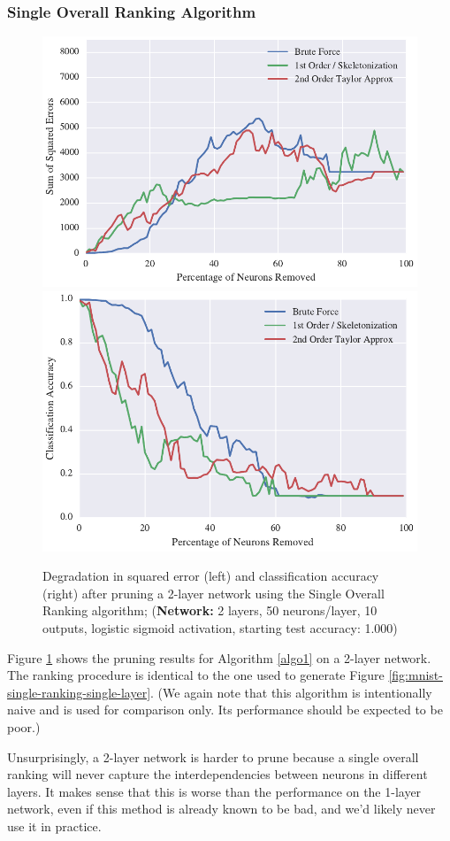 \subsubsection{Single Overall Ranking Algorithm}
\begin{figure}[!ht]
\centering
\includegraphics[width=0.49\linewidth]{png/mnist-deep-single-pass-method.pdf}
\includegraphics[width=0.49\linewidth]{png/mnist-deep-single-pass-accuracy.pdf}
\caption{Degradation in squared error (left) and classification accuracy (right) after pruning a 2-layer network using the Single Overall Ranking algorithm; (\textbf{Network:} 2 layers, 50 neurons/layer, 10 outputs, logistic sigmoid activation, starting test accuracy: 1.000)}
\label{fig:mnist-single-ranking-double-layer}
\end{figure}

Figure \ref{fig:mnist-single-ranking-double-layer} shows the pruning results for Algorithm \ref{algo1} on a 2-layer network. The ranking procedure is identical to the one used to generate Figure \ref{fig:mnist-single-ranking-single-layer}. (We again note that this algorithm is intentionally naive and is used for comparison only. Its performance should be expected to be poor.) 

Unsurprisingly, a 2-layer network is harder to prune because a single overall ranking will never capture the interdependencies between neurons in different layers. It makes sense that this is worse than the performance on the 1-layer network, even if this method is already known to be bad, and we'd likely never use it in practice. 

